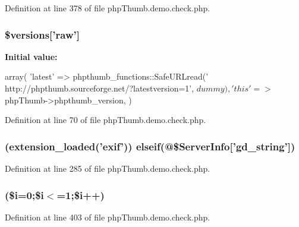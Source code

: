 \-Definition at line 378 of file php\-Thumb.\-demo.\-check.\-php.

\hypertarget{php_thumb_8demo_8check_8php_a472d5d8f14cb6f160bae44d85d968e10}{
\subsubsection[{\$versions}]{\setlength{\rightskip}{0pt plus 5cm}\$versions\mbox{[}'raw'\mbox{]}}}\label{php_thumb_8demo_8check_8php_a472d5d8f14cb6f160bae44d85d968e10}
{\bfseries \-Initial value\-:}
\begin{DoxyCode}
 array(
        'latest' => phpthumb_functions::SafeURLread('
      http://phpthumb.sourceforge.net/?latestversion=1', $dummy),
        'this'   => $phpThumb->phpthumb_version,
)
\end{DoxyCode}


\-Definition at line 70 of file php\-Thumb.\-demo.\-check.\-php.

\hypertarget{php_thumb_8demo_8check_8php_af92779326267616cd7c3cdaaa9484bc9}{
\subsubsection[{elseif}]{ (extension\-\_\-loaded('exif')) {\bf elseif}(@\$\-Server\-Info\mbox{[}'gd\-\_\-string'\mbox{]})}}\label{php_thumb_8demo_8check_8php_af92779326267616cd7c3cdaaa9484bc9}


\-Definition at line 285 of file php\-Thumb.\-demo.\-check.\-php.

\hypertarget{php_thumb_8demo_8check_8php_a033a4ad9dabb361619d4269baa32c2da}{
\subsubsection[{for}]{(\$i=0;\$i$<$=1;\$i++)}}\label{php_thumb_8demo_8check_8php_a033a4ad9dabb361619d4269baa32c2da}


\-Definition at line 403 of file php\-Thumb.\-demo.\-check.\-php.

